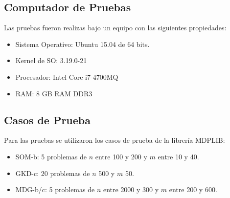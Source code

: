 \documentclass{ci5652}
\begin{document}
\subsection{Computador de Pruebas}
Las pruebas fueron realizas bajo un equipo con las siguientes propiedades:
\begin{itemize} \itemsep0pt
	\item Sistema Operativo: Ubuntu 15.04 de 64 bits.
	\item Kernel de SO: 3.19.0-21
	\item Procesador: Intel Core i7-4700MQ
	\item RAM: 8 GB RAM DDR3
\end{itemize}

\subsection{Casos de Prueba}
Para las pruebas se utilizaron los casos de prueba de la librería MDPLIB:
\begin{itemize}
	\item SOM-b: 5 problemas de $n$ entre 100 y 200 y $m$ entre 10 y 40.
	\item GKD-c: 20 problemas de $n$ 500 y $m$ 50.
	\item MDG-b/c: 5 problemas de $n$ entre 2000 y 300 y $m$ entre 200 y 600.
\end{itemize}


\small

\end{document}
